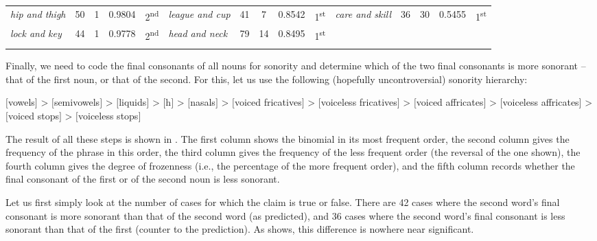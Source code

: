 \begin{table}
{\begin{tabular}[t]{l *{2}{S[table-format=3]} S[table-format=1.4] l  l *{2}{S[table-format=3]} S[table-format=1.4] l  l *{2}{S[table-format=3]} S[table-format=1.4] l}
\textit{hip and thigh} & 50 & 1 & 0.9804 & 2\textsuperscript{nd} & \textit{league and cup} & 41 & 7 & 0.8542 & 1\textsuperscript{st} & \textit{care and skill} & 36 & 30 & 0.5455 & 1\textsuperscript{st} \\
\textit{lock and key} & 44 & 1 & 0.9778 & 2\textsuperscript{nd} & \textit{head and neck} & 79 & 14 & 0.8495 & 1\textsuperscript{st} & & & & & \\
\lspbottomrule
{} \\ %
\end{tabular}}
\end{table}

Finally, we need to code  the final consonants  of all nouns  for sonority  and determine which of the two final consonants is more sonorant -- that of the first noun, or that of the second. For this, let us use the following (hopefully uncontroversial) sonority  hierarchy:
\begin{exe}
\ex $[$vowels$]$ > $[$semivowels$]$ > $[$liquids$]$ > $[$h$]$ > $[$nasals$]$ > $[$voiced fricatives$]$ > $[$voiceless fricatives$]$ > $[$voiced affricates$]$ > $[$voiceless affricates$]$ > $[$voiced stops$]$ > $[$voiceless stops$]$
\label{ex:sonorityhierarchy}
\end{exe}

The result of all these steps is shown in . The first column shows the binomial  in its most frequent order, the second column gives the frequency  of the phrase in this order, the third column gives the frequency of the less frequent order (the reversal of the one shown), the fourth column gives the degree of frozenness  (i.e., the percentage of the more frequent order), and the fifth column records whether the final consonant  of the first or of the second noun  is less  sonorant.

Let us first simply look at the number of cases for which the claim is true or false. There are 42 cases where the second word's final consonant  is more sonorant  than that of the second word (as predicted), and 36 cases where the second word's final consonant is less sonorant than that of the first (counter to the prediction). As  shows, this difference is nowhere near significant.

